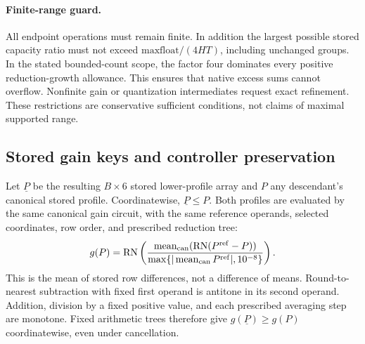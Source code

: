 \documentclass[11pt]{article}
\begin{document}
\paragraph{Finite-range guard.}
All endpoint operations must remain finite.  In addition the largest possible stored capacity ratio must not exceed $\mathrm{maxfloat}/(4HT)$, including unchanged groups.  In the stated bounded-count scope, the factor four dominates every positive reduction-growth allowance. This ensures that native excess sums cannot overflow.  Nonfinite gain or quantization intermediates request exact refinement.  These restrictions are conservative sufficient conditions, not claims of maximal supported range.

\subsection{Stored gain keys and controller preservation}

Let $\underline P$ be the resulting $B\times6$ stored lower-profile array and $P$ any descendant's canonical stored profile.  Coordinatewise, $\underline P\le P$.  Both profiles are evaluated by the same canonical gain circuit, with the same reference operands, selected coordinates, row order, and prescribed reduction tree:
\[
 g(P)=\operatorname{RN}\left(
 \frac{\operatorname{mean}_{\rm can}
       (\operatorname{RN}(P^{\rm ref}-P))}
      {\max\{|\operatorname{mean}_{\rm can}P^{\rm ref}|,10^{-8}\}}
 \right).
\]
This is the mean of stored row differences, not a difference of means. Round-to-nearest subtraction with fixed first operand is antitone in its second operand.  Addition, division by a fixed positive value, and each prescribed averaging step are monotone.  Fixed arithmetic trees therefore give $g(\underline P)\ge g(P)$ coordinatewise, even under cancellation.
\end{document}
